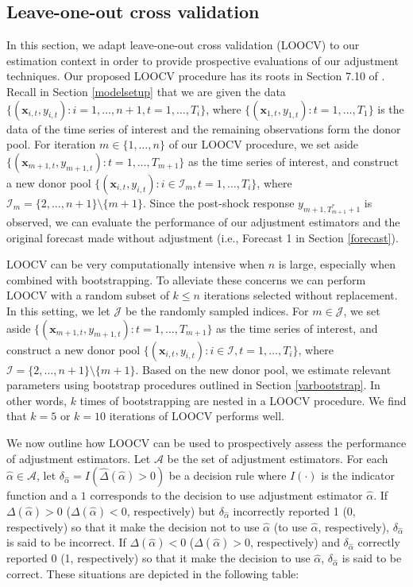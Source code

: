 \documentclass[11pt]{article}
\def\mbf#1{\mathbf{#1}} %
\def\mc#1{\mathcal{#1}} %
\theoremstyle{definition}
\begin{document}
\subsection{Leave-one-out cross validation}
\label{loocv}

In this section, we adapt leave-one-out cross validation (LOOCV) to our estimation context in order to provide prospective evaluations of our adjustment techniques. Our proposed LOOCV procedure has its roots in Section 7.10 of \citet{hastie2009elements}.  Recall in Section \ref{modelsetup} that we are given the data $\{(\mbf{x}_{i,t}, y_{i,t}) \colon i = 1, \ldots, n+1, t = 1, \ldots, T_i\}$, where $\{(\mbf{x}_{1,t}, y_{1,t})\colon t = 1, \ldots, T_1\}$ is the data of the time series of interest and the remaining observations form the donor pool. For iteration $m \in \{1,\ldots,n\}$ of our LOOCV procedure, we set aside $\{(\mbf{x}_{m + 1, t}, y_{m + 1, t}) \colon t = 1, \ldots, T_{m+1}\}$ as the time series of interest, and construct a new donor pool $\{(\mbf{x}_{i, t}, y_{i, t}) \colon i \in \mc{I}_m, t = 1, \ldots, T_{i}\}$, where $\mc{I}_m=\{2, \ldots, n+1\} \setminus \{m+1\}$. Since the post-shock response $y_{m+1, T_{m+1}^*+1}$ is observed, we can evaluate the performance of our adjustment estimators and the original forecast made without adjustment (i.e., Forecast 1 in Section \ref{forecast}).

LOOCV can be very computationally intensive when $n$ is large, especially when combined with bootstrapping. To alleviate these concerns we can perform LOOCV with a random subset of $k \leq n$ iterations selected without replacement. In this setting, we let $\mc{J}$ be the randomly sampled indices. For $m \in \mc{J}$, we set aside $\{(\mbf{x}_{m + 1, t}, y_{m + 1, t}) \colon t = 1, \ldots, T_{m+1}\}$ as the time series of interest, and construct a new donor pool $\{(\mbf{x}_{i, t}, y_{i, t}) \colon i \in \mc{I}, t = 1, \ldots, T_{i}\}$, where $\mc{I}=\{2, \ldots, n+1\} \setminus \{m+1\}$. Based on the new donor pool, we estimate relevant parameters using bootstrap procedures outlined in Section \ref{varbootstrap}. In other words, $k$ times of bootstrapping are nested in a LOOCV procedure.  We find that $k=5$ or $k=10$ iterations of LOOCV performs well.

We now outline how LOOCV can be used to prospectively assess the performance of adjustment estimators. Let $\mc{A}$ be the set of adjustment estimators. For each $\hat{\alpha} \in \mc{A}$, let $\delta_{\hat{\alpha}} = I(\hat\Delta(\hat{\alpha})>0)$ be a decision rule where $I(\cdot)$ is the indicator function and a $1$ corresponds to the decision to use adjustment estimator $\hat\alpha$. If $\Delta(\hat{\alpha})>0$ ($\Delta(\hat{\alpha})<0$, respectively) but $\delta_{\hat{\alpha}}$ incorrectly reported 1 (0, respectively) so that it make the decision not to use $\hat{\alpha}$ (to use $\hat{\alpha}$, respectively), $\delta_{\hat{\alpha}}$ is said to be incorrect. If $\Delta(\hat{\alpha})<0$ ($\Delta(\hat{\alpha})>0$, respectively) and  $\delta_{\hat{\alpha}}$ correctly reported 0 (1, respectively) so that it make the decision to use $\hat{\alpha}$, $\delta_{\hat{\alpha}}$ is said to be correct. These situations are depicted in the following table: \vspace*{0.3cm}
\end{document}
